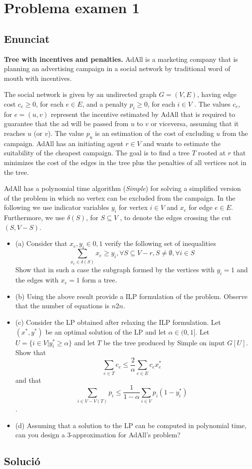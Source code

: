 \section{Problema examen 1}
\subsection{Enunciat}
\textbf{Tree with incentives and penalties.} AdAll is a marketing company that is planning an advertising campaign in a social network by traditional word of mouth with incentives. 

The social network is given by an undirected graph $G = (V,E)$, having edge cost $c_e \geq 0$, for each $e \in E$, and a penalty $p_i \geq 0$, for each $i \in V$ . The values $c_e$, for $e = (u,v)$ represent the incentive estimated by AdAll that is required to guarantee that the ad will be passed from $u$ to $v$ or viceversa, assuming that it reaches $u$ (or $v$). The value $p_u$ is an estimation of the cost of excluding $u$ from the campaign. AdAll has an initiating agent $r \in V$ and wants to estimate the suitability of the cheapest campaign. The goal is to find a tree $T$ rooted at $r$ that minimizes the cost of the edges in the tree plus the penalties of all vertices not in the tree.

AdAll has a polynomial time algorithm (\textit{Simple}) for solving a simplified version of the problem in which no vertex can be excluded from the campaign. In the following we use indicator variables $y_i$ for vertex $i \in V$ and $x_e$ for edge $e \in E$. Furthermore, we use $\delta(S)$, for $S \subseteq V$ , to denote the edges crossing the cut $(S,V-S)$. 

\begin{itemize}
    \item (a) Consider that $x_e,y_i \in{0,1}$ verify the following set of inequalities 
    \[
    \sum_{x_e \in \delta(S)}x_e \ge y_i,  \forall S \subseteq V -{r},S \neq \emptyset,\forall i \in S
    \] 
    Show that in such a case the subgraph formed by the vertices with $y_i = 1$ and the edges with $x_e  = 1$ form a tree. 
    \item (b) Using the above result provide a ILP formulation of the problem. Observe that the number of equations is $n2n$. 
    \item (c) Consider the LP obtained after relaxing the ILP formulation. Let $(x^{*},y^{*})$ be an optimal solution of the LP and let $\alpha \in (0,1]$. Let $U = \{i \in V | y^{*}_i \geq \alpha\}$ and let $T$ be the tree produced by Simple on input $G[U]$. Show that 
    \[
    \sum_{e\in T} c_e \leq \frac{2}{\alpha} \sum_{e\in E} c_e x^{*}_e
    \] 
    and that 
    \[
    \sum_{i \in V-V(T)} p_i \leq \frac{1}{1-\alpha} \sum_{i \in V}p_i(1-y^{*}_i)
    \]. 
    \item (d) Assuming that a solution to the LP can be computed in polynomial time, can you design a 3-approximation for AdAll’s problem?
\end{itemize}

\subsection{Solució}